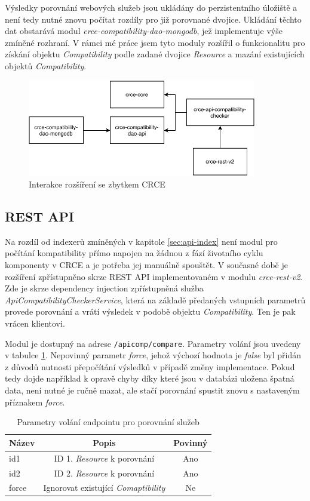 \documentclass[czech,DP]{thesiskiv}
\begin{document}
Výsledky porovnání webových služeb jsou ukládány do perzistentního úložiště a není tedy nutné znovu počítat rozdíly pro již porovnané dvojice. Ukládání těchto dat obstarává modul \textit{crce-compatibility-dao-mongodb}, jež implementuje výše  zmíněné rozhraní. V rámci mé práce jsem tyto moduly rozšířil o funkcionalitu pro získání objektu \textit{Compatibility} podle zadané dvojice \textit{Resource} a mazání existujících objektů \textit{Compatibility}.

\begin{figure}[h]
	\centering
	\includegraphics[width=10cm]{module-integration}
	\caption{Interakce rozšíření se zbytkem CRCE}
	\label{fig:apicomp-crce-interaction}
\end{figure}

\subsection{REST API}

Na rozdíl od indexerů zmíněných v kapitole \ref{sec:api-index} není modul pro počítání kompatibility přímo napojen na žádnou z fází životního cyklu komponenty v CRCE a je potřeba jej manuálně spouštět. V současné době je rozšíření zpřístupněno skrze REST API implementovaném v modulu \textit{crce-rest-v2}. Zde je skrze dependency injection zpřístupněná služba \textit{ApiCompatibilityCheckerService}, která na základě předaných vstupních parametrů provede porovnání a vrátí výsledek v podobě objektu \textit{Compatibility}. Ten je pak vrácen klientovi.

Modul je dostupný na adrese \verb|/apicomp/compare|. Parametry volání jsou uvedeny v tabulce \ref{tab:rest-cmp-params}. Nepovinný parametr \textit{force}, jehož výchozí hodnota je \textit{false} byl přidán z důvodů nutnosti přepočítání výsledků v případě změny implementace. Pokud tedy dojde například k opravě chyby díky které jsou v databázi uložena špatná data, není nutné je ručně mazat, ale stačí porovnání spustit znovu s nastaveným příznakem \textit{force}.

\begin{table}[h]
	\centering
	\begin{tabular} {|l|c|c|}
		\hline
		Název & Popis & Povinný \\
		\hline
		\hline
		id1 & ID 1. \textit{Resource} k porovnání & Ano \\
		\hline
		id2 & ID 2. \textit{Resource} k porovnání & Ano \\
		\hline
		force & Ignorovat existující \textit{Comaptibility} & Ne \\
		\hline		
	\end{tabular}
	\caption{Parametry volání endpointu pro porovnání služeb}
	\label{tab:rest-cmp-params}
\end{table}
\end{document}
